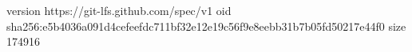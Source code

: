 version https://git-lfs.github.com/spec/v1
oid sha256:e5b4036a091d4cefeefdc711bf32e12e19c56f9e8eebb31b7b05fd50217e44f0
size 174916

